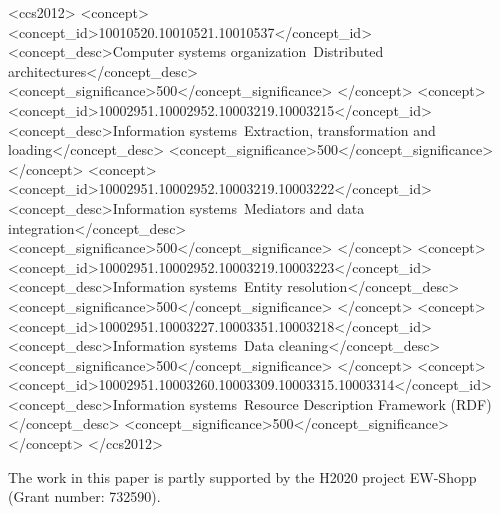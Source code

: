 \documentclass[sigconf, final]{acmart}
\begin{document}
%
%
\begin{CCSXML}
<ccs2012>
  <concept>
    <concept_id>10010520.10010521.10010537</concept_id>
    <concept_desc>Computer systems organization~Distributed architectures</concept_desc>
    <concept_significance>500</concept_significance>
  </concept>
  <concept>
    <concept_id>10002951.10002952.10003219.10003215</concept_id>
    <concept_desc>Information systems~Extraction, transformation and loading</concept_desc>
    <concept_significance>500</concept_significance>
  </concept>
  <concept>
    <concept_id>10002951.10002952.10003219.10003222</concept_id>
    <concept_desc>Information systems~Mediators and data integration</concept_desc>
    <concept_significance>500</concept_significance>
  </concept>
  <concept>
    <concept_id>10002951.10002952.10003219.10003223</concept_id>
    <concept_desc>Information systems~Entity resolution</concept_desc>
    <concept_significance>500</concept_significance>
  </concept>
  <concept>
    <concept_id>10002951.10003227.10003351.10003218</concept_id>
    <concept_desc>Information systems~Data cleaning</concept_desc>
    <concept_significance>500</concept_significance>
  </concept>
  <concept>
    <concept_id>10002951.10003260.10003309.10003315.10003314</concept_id>
    <concept_desc>Information systems~Resource Description Framework (RDF)</concept_desc>
    <concept_significance>500</concept_significance>
  </concept>
</ccs2012>
\end{CCSXML}





\maketitle





%


\begin{acks}
The work in this paper is partly supported by the H2020 project EW-Shopp (Grant number: 732590).
\end{acks}




\end{document}
